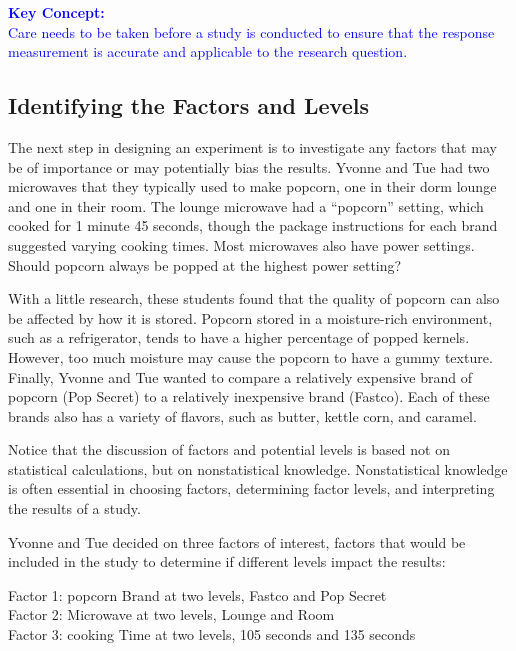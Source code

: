 \documentclass[
]{book}
\begin{document}
\textbf{\textcolor{blue}{Key Concept:}}\\
\textcolor{blue}{Care needs to be taken before a study is conducted to ensure that the response measurement is accurate and applicable to the research question.}

\hypertarget{identifying-the-factors-and-levels}{%
\subsection*{Identifying the Factors and Levels}\label{identifying-the-factors-and-levels}}

The next step in designing an experiment is to investigate any factors that may be of importance or may potentially bias the results. Yvonne and Tue had two microwaves that they typically used to make popcorn, one in their dorm lounge and one in their room. The lounge microwave had a ``popcorn'' setting, which cooked for 1 minute 45 seconds, though the package instructions for each brand suggested varying cooking times. Most microwaves also have power settings. Should popcorn always be popped at the highest power setting?

With a little research, these students found that the quality of popcorn can also be affected by how it is stored. Popcorn stored in a moisture-rich environment, such as a refrigerator, tends to have a higher percentage of popped kernels. However, too much moisture may cause the popcorn to have a gummy texture. Finally, Yvonne and Tue wanted to compare a relatively expensive brand of popcorn (Pop Secret) to a relatively inexpensive brand (Fastco). Each of these brands also has a variety of flavors, such as butter, kettle corn, and caramel.

Notice that the discussion of factors and potential levels is based not on statistical calculations, but on nonstatistical knowledge. Nonstatistical knowledge is often essential in choosing factors, determining factor levels, and interpreting the results of a study.

Yvonne and Tue decided on three factors of interest, factors that would be included in the study to determine if different levels impact the results:

Factor 1: popcorn Brand at two levels, Fastco and Pop Secret\\
Factor 2: Microwave at two levels, Lounge and Room\\
Factor 3: cooking Time at two levels, 105 seconds and 135 seconds
\end{document}
